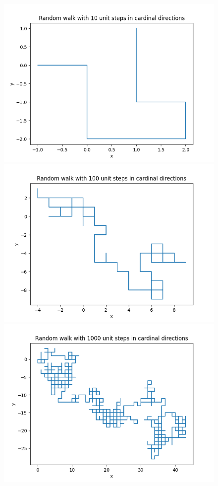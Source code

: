 \documentclass[a4paper,12pt]{article}
\begin{document}
\begin{figure}[!ht]
  \centering
  \begin{minipage}{0.45\textwidth}
    \includegraphics[width=\textwidth]{img/2_1a_random_10.png}
  \end{minipage}
  \begin{minipage}{0.45\textwidth}
    \includegraphics[width=\textwidth]{img/2_1a_random_100.png}
  \end{minipage}
  \includegraphics[scale=0.45]{img/2_1a_random_1000.png}

\end{figure}
\end{document}
